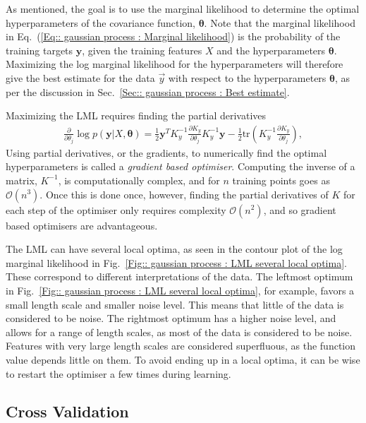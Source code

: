 \documentclass[twoside,english]{uiofysmaster}
\begin{document}
{{As mentioned, the goal is to use the marginal likelihood to determine the optimal hyperparameters of the covariance function, $\boldsymbol{\theta}$. Note that the marginal likelihood in Eq.~(\ref{Eq:: gaussian process : Marginal likelihood}) is the probability of the training targets $\textbf{y}$, given the training features $X$ and the hyperparameters $\boldsymbol{\theta}$. Maximizing the log marginal likelihood for the hyperparameters will therefore give the best estimate for the data $\vec{y}$ with respect to the hyperparameters $\boldsymbol{\theta}$, as per the discussion in Sec.~\ref{Sec:: gaussian process : Best estimate}. 

Maximizing the LML requires finding the partial derivatives 
\begin{align}
\frac{\partial}{\partial \theta_j}
 \log p(\textbf{y}|X, \boldsymbol{\theta}) = \frac{1}{2} \textbf{y}^T K_y^{-1} \frac{\partial K_y}{\partial \theta_j} K_y^{-1} \textbf{y} - \frac{1}{2} \text{tr} (K_y^{-1} \frac{\partial K_y}{\partial \theta_j}),
\end{align}
Using partial derivatives, or the gradients, to numerically find the optimal hyperparameters is called a \textit{gradient based optimiser}. Computing the inverse of a matrix, $K^{-1}$, is computationally complex, and for $n$ training points goes as $\mathcal{O}(n^3)$. Once this is done once, however, finding the partial derivatives of $K$ for each step of the optimiser only requires complexity $\mathcal{O}(n^2)$, and so gradient based optimisers are advantageous.

The LML can have several local optima, as seen in the contour plot of the log marginal likelihood in Fig.~\ref{Fig:: gaussian process : LML several local optima}. These correspond to different interpretations of the data. The leftmost optimum in Fig.~\ref{Fig:: gaussian process : LML several local optima}, for example, favors a small length scale and smaller noise level. This means that little of the data is considered to be noise. The rightmost optimum has a higher noise level, and allows for a range of length scales, as most of the data is considered to be noise. Features with very large length scales are considered superfluous, as the function value depends little on them. To avoid ending up in a local optima, it can be wise to restart the optimiser a few times during learning.





\subsection{Cross Validation}\label{Sec:: gaussian process : Cross Validation}


}}
\end{document}
